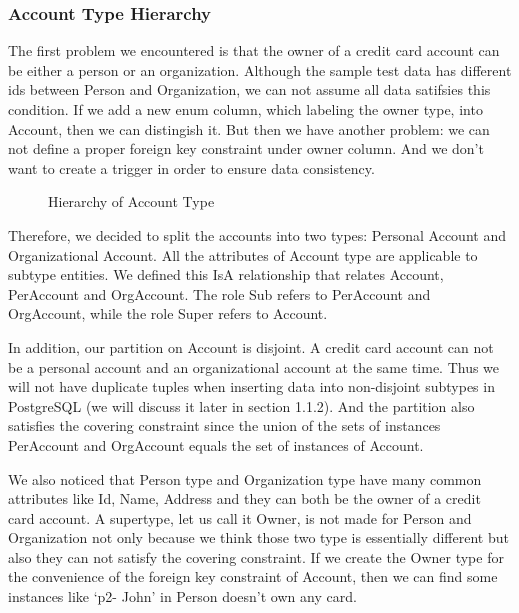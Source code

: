 \documentclass[11pt]{article}
\begin{document}
\subsubsection{Account Type Hierarchy}

\par
The first problem we encountered is that the owner of a credit card account can be either a person or an organization. Although the sample test data has different ids between Person and Organization, we can not assume all data satifsies this condition. If we add a new enum column, which labeling the owner type, into Account, then we can distingish it. But then we have another problem: we can not define a proper foreign key constraint under owner column. And we don't want to create a trigger in order to ensure data consistency.

\begin{figure}
\caption{Hierarchy of Account Type}
\end{figure}

\par
Therefore, we decided to split the accounts into two types: Personal Account and Organizational Account. All the attributes of Account type are applicable to subtype entities. We defined this IsA relationship that relates Account, PerAccount and OrgAccount. The role Sub refers to PerAccount and OrgAccount, while the role Super refers to Account.
\par
In addition, our partition on Account is disjoint. A credit card account can not be a personal account and an organizational account at the same time. Thus we will not have duplicate tuples when inserting data into non-disjoint subtypes in PostgreSQL (we will discuss it later in section 1.1.2). And the partition also satisfies the covering constraint since the union of the sets of instances PerAccount and OrgAccount equals the set of instances of Account.
\par
We also noticed that Person type and Organization type have many common attributes like Id, Name, Address and they can both be the owner of a credit card account. A supertype, let us call it Owner, is not made for Person and Organization not only because we think those two type is essentially different but also they can not satisfy the covering constraint. If we create the Owner type for the convenience of the foreign key constraint of Account, then we can find some instances like `p2- John' in Person doesn't own any card.
\par
\end{document}

